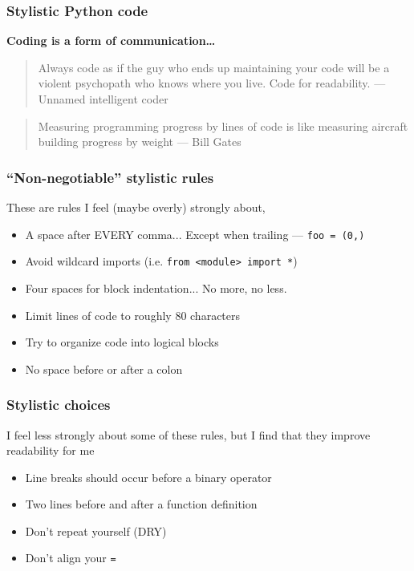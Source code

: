 \documentclass[10pt]{beamer}
\begin{document}
  \begin{frame} \frametitle{Stylistic Python code}

    \textbf{Coding is a form of communication\dots}

    \vspace{0.3cm}

    \begin{quote}
      Always code as if the guy who ends up maintaining your code will be a violent psychopath who
      knows where you live. Code for readability. --- Unnamed intelligent coder
    \end{quote}

    \vspace{0.1cm}

    \begin{quote}
      Measuring programming progress by lines of code is like measuring aircraft building progress
      by weight --- Bill Gates
    \end{quote}

  \end{frame}

  \begin{frame} \frametitle{``Non-negotiable'' stylistic rules}

    These are rules I feel (maybe overly) strongly about,

    \begin{itemize}
      \item A space after EVERY comma... Except when trailing --- \texttt{foo = (0,)}
      \item Avoid wildcard imports (i.e. \texttt{from <module> import *})
      \item Four spaces for block indentation... No more, no less.
      \item Limit lines of code to roughly 80 characters
      \item Try to organize code into logical blocks
      \item No space before or after a colon
    \end{itemize}

  \end{frame}

  \begin{frame} \frametitle{Stylistic choices}

    I feel less strongly about some of these rules, but I find that they improve readability for me

    \begin{itemize}
      \item Line breaks should occur before a binary operator
      \item Two lines before and after a function definition
      \item Don't repeat yourself (DRY)
      \item Don't align your \texttt{=}
    \end{itemize}

  \end{frame}
\end{document}
